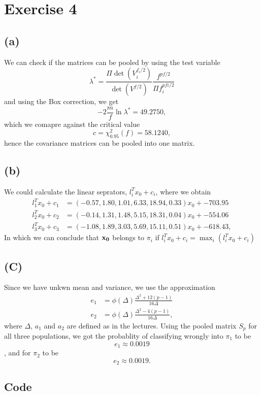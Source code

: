 
\section*{Exercise 4}
\label{sec:exercise-4}

\subsection*{(a)}
\label{sec:a-3}

We can check if the matrices can be pooled by using the test variable
\begin{equation*}
  \lambda^* = \frac{\Pi \det(V_i ^{f_i/2})}{\det(V^{f/2})}
  \frac{f^{pf/2}}{\Pi f_i ^{pfi/2}}
\end{equation*}
and using the Box correction, we get
\begin{equation*}
  -2  \frac{m}{f} \ln \lambda^* = 49.2750,
\end{equation*}
which we comapre against the critical value
\begin{equation*}
  c = \chi^2_{0.95}(f) = 58.1240,
\end{equation*}
hence the covariance matrices can be pooled into one matrix.

\subsection*{(b)}
\label{sec:b-3}

We could calculate the linear seprators, $ l_i^T x_0 + c_i$, where
we obtain
\begin{align*}
l_1^T x_0 + c_1 &= (-0.57, 1.80, 1.01, 6.33, 18.94, 0.33)x_0 + -703.95 \\ 
l_2^T x_0 + c_2 &= (-0.14, 1.31, 1.48, 5.15, 18.31, 0.04)x_0 + -554.06 \\ 
l_3^T x_0 + c_3 &= (-1.08, 1.89, 3.03, 5.69, 15.11, 0.51)x_0 + -618.43,
\end{align*}
In which we can conclude that ${\bf x_0}$ belongs to  $\pi_i$ if $
  l_i^T x_0 + c_i = \max_i \left(   l_i^T x_0 + c_i\right)
$

\subsection*{(C)}
\label{sec:c-3}

Since we have unkwn mean and variance, we use the approximation 
\begin{align*}
  e_1 &= \phi(\Delta) \frac{\Delta^2 + 12(p-1)}{16\Delta} \\
  e_2 &=  \phi(\Delta)\frac{\Delta^2 - 4(p-1)}{16\Delta},
\end{align*}
where $\Delta$,  $a_1$ and $a_2$  are defined as in the lectures.
Using the pooled matrix $S_p$ for all three populations, we got the
probablity of classifying wrongly into $\pi_1$ to be
\begin{equation*}
  e_1 \approx 0.0019
\end{equation*},
and for $\pi_2$ to be
\begin{equation*}
  e_2  \approx 0.0019.
\end{equation*}
\subsection*{Code}
\label{sec:code}




